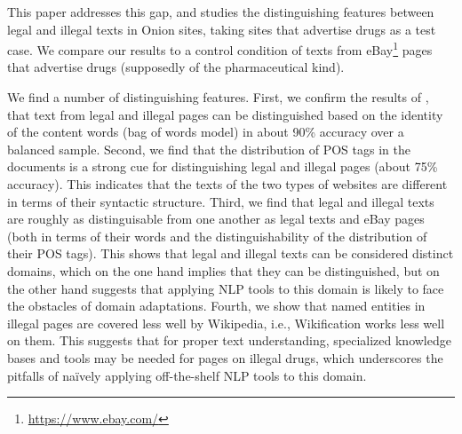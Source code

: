 \documentclass[11pt,a4paper]{article}
\begin{document}
  This paper addresses this gap, and studies the distinguishing features between legal and illegal texts in Onion sites,
  taking sites that advertise drugs as a test case. We compare our results to a control condition of texts 
  from eBay\footnote{\url{https://www.ebay.com/}} pages that advertise drugs
  (supposedly of the pharmaceutical kind). 
  
  We find a number of distinguishing features. First, we confirm the results of \citet{Avarikioti18}, that text from legal and illegal
  pages can be distinguished based on the identity of the content words (bag of words model) 
  in about 90\% accuracy over a balanced sample. Second, we find that the distribution of POS tags in the documents is a strong cue for distinguishing
  legal and illegal pages (about 75\% accuracy). This indicates that the texts of the two types of websites are different in terms of their syntactic 
  structure. Third, we find that legal and illegal texts are roughly as distinguisable from one another as legal texts and eBay pages (both in terms
  of their words and the distinguishability of the distribution of their POS tags). This shows that legal and illegal texts can be considered
  distinct domains, which on the one hand implies that they can be distinguished, but on the other hand suggests that applying NLP tools to this
  domain is likely to face the obstacles of domain adaptations.  
  Fourth, we show that named entities in illegal pages are covered less well by Wikipedia, i.e., Wikification works less well on them.
  This suggests that for proper text understanding, specialized knowledge bases and tools may be needed for pages on illegal drugs, 
    which underscores the pitfalls of na\"{i}vely applying off-the-shelf NLP tools to this domain.
  
  
  
%   
%   
%   
%
%
%
%
\end{document}

